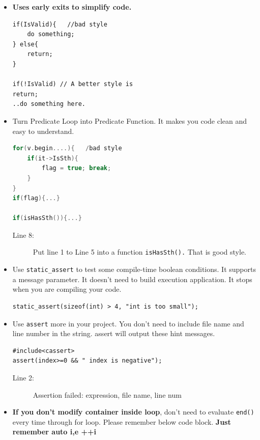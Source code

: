 \documentclass[a4paper,11pt,twoside]{book}
\begin{document}
\begin{itemize}
	\item \textbf{Uses early exits to simplify code.}
	
\begin{lstlisting}[numbers=none]
if(IsValid){   //bad style
	do something;
} else{
	return;
}
	
if(!IsValid) // A better style is
return;
..do something here.
	\end{lstlisting}
	
	\item Turn Predicate Loop into Predicate Function. It makes you code clean and easy to understand.
	
\begin{lstlisting}[frame=single, language=c++]
for(v.begin....){   /bad style
	if(it->IsSth){
		flag = true; break;
	}
}
if(flag){...}
	
if(isHasSth()){...}
\end{lstlisting}
\begin{description}
	\item[Line 8:] Put line 1 to Line 5 into a function \texttt{isHasSth().} That is good style.
\end{description}
	
	\item Use \texttt{static\_assert} to test some compile-time boolean conditions. It supports a message parameter. It doesn't need to build execution application. It stops when you are compiling your code. 
\begin{lstlisting}[numbers=none]
static_assert(sizeof(int) > 4, "int is too small");
\end{lstlisting}
	
	\item Use \texttt{assert} more in your project. You don't need to include file name and line number in the string. assert will output these hint messages.
\begin{lstlisting}[numbers=none]
#include<cassert>
assert(index>=0 && " index is negative");
\end{lstlisting}
\begin{description}
	\item[Line 2:] Assertion failed: expression, file name, line num
\end{description}

	
	\item \textbf{If you don't modify container inside loop}, don't need to evaluate \texttt{end()} every time through for loop. Please remember below code block. \textbf{Just remember auto i,e ++i}


\end{itemize}
\end{document}
